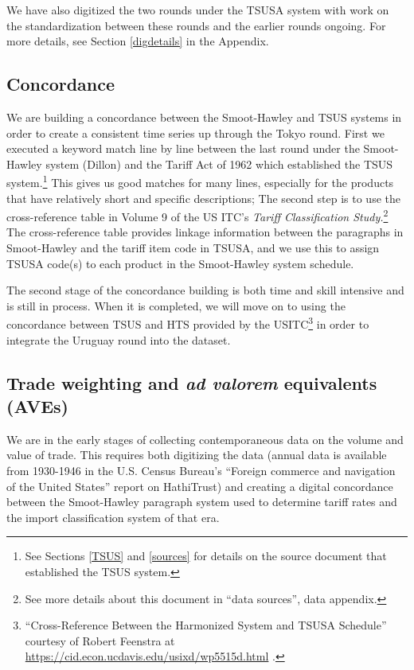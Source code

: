 \documentclass[
  12pt,
]{article}
\begin{document}
We have also digitized the two rounds under the TSUSA system with work on the standardization between these rounds and the earlier rounds ongoing. For more details, see Section \ref{digdetails} in the Appendix.

\hypertarget{concordance}{%
\subsection{Concordance}\label{concordance}}

We are building a concordance between the Smoot-Hawley and TSUS systems in order to create a consistent time series up through the Tokyo round. First we executed a keyword match line by line between the last round under the Smoot-Hawley system (Dillon) and the Tariff Act of 1962 which established the TSUS system.\footnote{See Sections \ref{TSUS} and \ref{sources} for details on the source document that established the TSUS system.} This gives us good matches for many lines, especially for the products that have relatively short and specific descriptions; The second step is to use the cross-reference table in Volume 9 of the US ITC's \emph{Tariff Classification Study.}\footnote{See more details about this document in ``data sources'', data appendix.} The cross-reference table provides linkage information between the paragraphs in Smoot-Hawley and the tariff item code in TSUSA, and we use this to assign TSUSA code(s) to each product in the Smoot-Hawley system schedule.

The second stage of the concordance building is both time and skill intensive and is still in process. When it is completed, we will move on to using the concordance between TSUS and HTS provided by the USITC\footnote{``Cross-Reference Between the Harmonized System and TSUSA Schedule'' courtesy of Robert Feenstra at \url{https://cid.econ.ucdavis.edu/usixd/wp5515d.html} .} in order to integrate the Uruguay round into the dataset.

\hypertarget{trade-weighting-and-ad-valorem-equivalents-aves}{%
\subsection{\texorpdfstring{Trade weighting and \emph{ad valorem} equivalents (AVEs)}{Trade weighting and ad valorem equivalents (AVEs)}}\label{trade-weighting-and-ad-valorem-equivalents-aves}}

We are in the early stages of collecting contemporaneous data on the volume and value of trade. This requires both digitizing the data (annual data is available from 1930-1946 in the U.S. Census Bureau's ``Foreign commerce and navigation of the United States'' report on HathiTrust) and creating a digital concordance between the Smoot-Hawley paragraph system used to determine tariff rates and the import classification system of that era.
\end{document}

